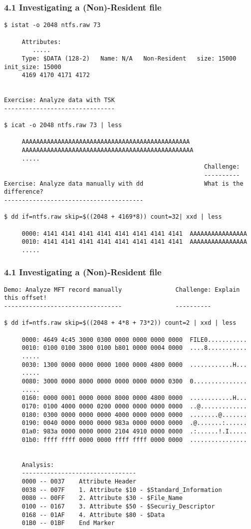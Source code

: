 \begin{frame}[fragile]
  \frametitle{4.1 Investigating a (Non)-Resident file}
  \begin{lstlisting}[basicstyle=\tiny]
$ istat -o 2048 ntfs.raw 73

     Attributes:
        .....
     Type: $DATA (128-2)   Name: N/A   Non-Resident   size: 15000  init_size: 15000
     4169 4170 4171 4172


Exercise: Analyze data with TSK
-------------------------------

$ icat -o 2048 ntfs.raw 73 | less

     AAAAAAAAAAAAAAAAAAAAAAAAAAAAAAAAAAAAAAAAAAAAAAA
     AAAAAAAAAAAAAAAAAAAAAAAAAAAAAAAAAAAAAAAAAAAAAAAA
     .....
                                                        Challenge:
                                                        ----------
Exercise: Analyze data manually with dd                 What is the difference?
---------------------------------------

$ dd if=ntfs.raw skip=$((2048 + 4169*8)) count=32| xxd | less

     0000: 4141 4141 4141 4141 4141 4141 4141 4141  AAAAAAAAAAAAAAAA
     0010: 4141 4141 4141 4141 4141 4141 4141 4141  AAAAAAAAAAAAAAAA
     .....
  \end{lstlisting}
\end{frame}


\begin{frame}[fragile]
  \frametitle{4.1 Investigating a (Non)-Resident file}
  \begin{lstlisting}[basicstyle=\tiny]
Demo: Analyze MFT record manually               Challenge: Explain this offset!
---------------------------------               ----------

$ dd if=ntfs.raw skip=$((2048 + 4*8 + 73*2)) count=2 | xxd | less

     0000: 4649 4c45 3000 0300 0000 0000 0000 0000  FILE0...........
     0010: 0100 0100 3800 0100 b801 0000 0004 0000  ....8...........
     .....
     0030: 1300 0000 0000 0000 1000 0000 4800 0000  ............H...
     .....
     0080: 3000 0000 8000 0000 0000 0000 0000 0300  0...............
     .....
     0160: 0000 0001 0000 0000 8000 0000 4800 0000  ............H...
     0170: 0100 4000 0000 0200 0000 0000 0000 0000  ..@.............
     0180: 0300 0000 0000 0000 4000 0000 0000 0000  ........@.......
     0190: 0040 0000 0000 0000 983a 0000 0000 0000  .@.......:......
     01a0: 983a 0000 0000 0000 2104 4910 0000 0000  .:......!.I.....
     01b0: ffff ffff 0000 0000 ffff ffff 0000 0000  ................


     Analysis:
     --------------------------------
     0000 -- 0037    Attribute Header
     0038 -- 007F    1. Attribute $10 - $Standard_Information
     0080 -- 00FF    2. Attribute $30 - $File_Name
     0100 -- 0167    3. Attribute $50 - $Securiy_Descriptor
     0168 -- 01AF    4. Attribute $80 - $Data
     01B0 -- 01BF    End Marker
  \end{lstlisting}
\end{frame}


